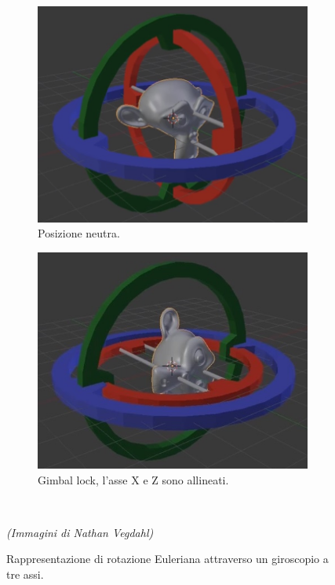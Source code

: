 \begin{figure}
\centering
\begin{subfigure}{.5\textwidth}
  \centering
  \includegraphics[width=.9\linewidth]{Figures/euler-1.jpg}
  \caption{Posizione neutra.}
  \label{fig:eulerA}
\end{subfigure}%
\begin{subfigure}{.5\textwidth}
  \centering
  \includegraphics[width=.9\linewidth]{Figures/euler-2.jpg}
  \caption{Gimbal lock, l'asse X e Z sono allineati.}
  \label{fig:eulerB}
\end{subfigure}\\[2ex]
  \begin{minipage}{\textwidth}
  \footnotesize
  \emph{(Immagini di Nathan Vegdahl)}
  \end{minipage}
\decoRule
\caption[Rotazione Euleriana]{Rappresentazione di rotazione Euleriana attraverso un giroscopio a tre assi.}
\label{fig:euler}
\end{figure}

